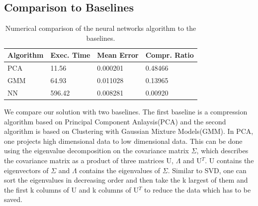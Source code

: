 



\subsection{Comparison to Baselines}


\begin{table}
\centering
    \begin{tabular}{| l | l | l | l |}
    \hline
    Algorithm & Exec. Time & Mean Error & Compr. Ratio \\ \hline
    PCA & 11.56 & 0.000201 & 0.48466\\ \hline
    GMM & 64.93 & 0.011028 & 0.13965 \\ \hline
    NN & 596.42 & 0.008281 & 0.00920 \\
    \hline
    \end{tabular}
    \caption{Numerical comparison of the neural networks algorithm to the baselines.}
    \label{tab:compareBaselines}
\end{table}

We compare our solution with two baselines. The first baseline is a compression algorithm based on Principal Component Anlaysis(PCA) and the second algorithm is based on Clustering with Gaussian Mixture Models(GMM).  
\newline
In PCA, one projects high dimensional data to low dimensional data. This can be done using the eigenvalue decomposition on the covariance matrix $\Sigma$, which describes the covariance matrix as a product of three matrices U, $\Lambda$ and U$^T$. U contains the eigenvectors of  $\Sigma$ and $\Lambda$ contains the eigenvalues of $\Sigma$. Similar to SVD, one can sort the eigenvalues in decreasing order and then take the k largest of them and the first k columns of U and k columns of U$^T$ to reduce the data which has to be saved. 
\newline

